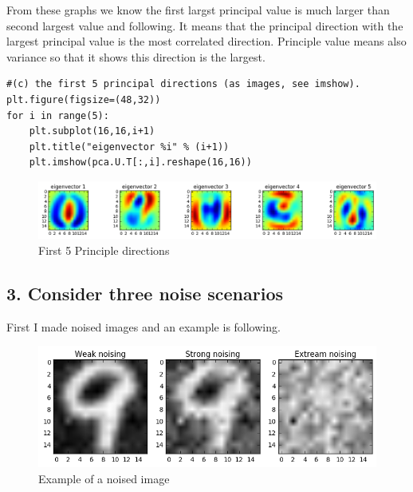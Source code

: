 \documentclass[a4paper,11pt]{article}
\begin{document}
\begin{verbatim}

\end{verbatim}

From these graphs we know the first largst principal value is much larger than second largest value and following. It means that the principal direction with the largest principal value is the most correlated direction. Principle value means also variance so that it shows this direction is the largest.  \\ 

\begin{verbatim}
#(c) the first 5 principal directions (as images, see imshow).
plt.figure(figsize=(48,32))
for i in range(5):
    plt.subplot(16,16,i+1)
    plt.title("eigenvector %i" % (i+1))
    plt.imshow(pca.U.T[:,i].reshape(16,16))
\end{verbatim}


\begin{figure}[htbp]
  \includegraphics[scale=0.4]{5eigv.png}
  \caption{First 5 Principle directions}
\end{figure}

\subsection*{3. Consider three noise scenarios}
First I made noised images and an example is following.
\begin{figure}[htbp]
  \includegraphics[scale=0.4]{noisimg.png}
  \caption{Example of a noised image}
\end{figure}
\end{document}
